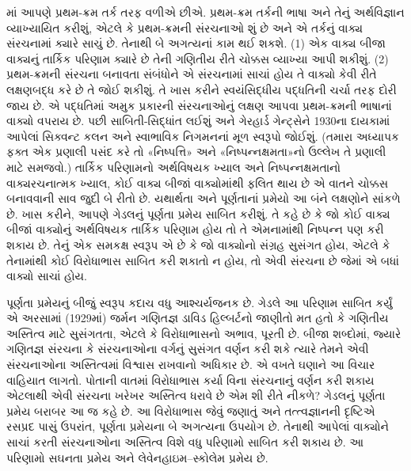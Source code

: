 માં આપણે પ્રથમ-ક્રમ તર્ક તરફ વળીએ છીએ. પ્રથમ-ક્રમ
તર્કની ભાષા અને તેનું અર્થવિજ્ઞાન વ્યાખ્યાયિત કરીશું, એટલે કે પ્રથમ-ક્રમની
સંરચનાઓ શું છે અને એ તર્કનું વાક્ય સંરચનામાં ક્યારે સાચું છે. તેનાથી બે
અગત્યનાં કામ થઈ શકશે. (1) એક વાક્ય બીજા વાક્યનું તાર્કિક પરિણામ
ક્યારે છે તેની ગણિતીય રીતે ચોક્કસ વ્યાખ્યા આપી શકીશું. (2) પ્રથમ-ક્રમની
સંરચના બનાવતા સંબંધોને એ સંરચનામાં સાચાં હોય તે વાક્યો કેવી રીતે
લક્ષણબદ્ધ કરે છે તે જોઈ શકીશું. તે ખાસ કરીને સ્વયંસિદ્ધીય પદ્ધતિની
ચર્ચા તરફ દોરી જાય છે. એ પદ્ધતિમાં અમુક પ્રકારની સંરચનાઓનું લક્ષણ
આપવા પ્રથમ-ક્રમની ભાષાનાં વાક્યો વપરાય છે. પછી સાબિતી-સિદ્ધાંત
લઈશું અને ગેરહાર્ડ ગેન્ટ્સેને 1930ના દાયકામાં આપેલાં સિક્વન્ટ કલન
અને સ્વાભાવિક નિગમનનાં મૂળ સ્વરૂપો જોઈશું. (તમારા અધ્યાપક ફક્ત એક પ્રણાલી
પસંદ કરે તો «નિષ્પત્તિ» અને «નિષ્પન્નક્ષમતા»નો ઉલ્લેખ તે પ્રણાલી
માટે સમજવો.) તાર્કિક પરિણામનો અર્થવિષયક ખ્યાલ અને નિષ્પન્નક્ષમતાનો
વાક્યરચનાત્મક ખ્યાલ, કોઈ વાક્ય બીજાં વાક્યોમાંથી ફલિત થાય છે એ વાતને
ચોક્કસ બનાવવાની સાવ જુદી બે રીતો છે. યથાર્થતા અને પૂર્ણતાનાં પ્રમેયો
આ બંને લક્ષણોને સાંકળે છે. ખાસ કરીને, આપણે ગેડલનું પૂર્ણતા પ્રમેય
સાબિત કરીશું. તે કહે છે કે જો કોઈ વાક્ય બીજાં વાક્યોનું અર્થવિષયક
તાર્કિક પરિણામ હોય તો તે એમનામાંથી નિષ્પન્ન પણ કરી શકાય છે. તેનું
એક સમકક્ષ સ્વરૂપ એ છે કે જો વાક્યોનો સંગ્રહ સુસંગત હોય, એટલે કે
તેનામાંથી કોઈ વિરોધાભાસ સાબિત કરી શકાતો ન હોય, તો એવી સંરચના છે
જેમાં એ બધાં વાક્યો સાચાં હોય.

પૂર્ણતા પ્રમેયનું બીજું સ્વરૂપ કદાચ વધુ આશ્ચર્યજનક છે. ગેડલે આ પરિણામ
સાબિત કર્યું એ અરસામાં (1929માં) જર્મન ગણિતજ્ઞ ડાવિડ હિલ્બર્ટનો જાણીતો
મત હતો કે ગણિતીય અસ્તિત્વ માટે સુસંગતતા, એટલે કે વિરોધાભાસનો અભાવ,
પૂરતી છે. બીજા શબ્દોમાં, જ્યારે ગણિતજ્ઞ સંરચના કે સંરચનાઓના વર્ગનું
સુસંગત વર્ણન કરી શકે ત્યારે તેમને એવી સંરચનાઓના અસ્તિત્વમાં વિશ્વાસ
રાખવાનો અધિકાર છે. એ વખતે ઘણાને આ વિચાર વાહિયાત લાગતો. પોતાની
વાતમાં વિરોધાભાસ કર્યા વિના સંરચનાનું વર્ણન કરી શકાય એટલાથી એવી
સંરચના ખરેખર અસ્તિત્વ ધરાવે છે એમ શી રીતે નીકળે? ગેડલનું પૂર્ણતા
પ્રમેય બરાબર આ જ કહે છે. આ વિરોધાભાસ જેવું જણાતું અને તત્ત્વજ્ઞાનની
દૃષ્ટિએ રસપ્રદ પાસું ઉપરાંત, પૂર્ણતા પ્રમેયના બે અગત્યના ઉપયોગ છે.
તેનાથી આપેલાં વાક્યોને સાચાં કરતી સંરચનાઓના અસ્તિત્વ વિશે વધુ પરિણામો
સાબિત કરી શકાય છે. આ પરિણામો સઘનતા પ્રમેય અને
લેવેનહાઇમ--સ્કોલેમ પ્રમેય છે.


